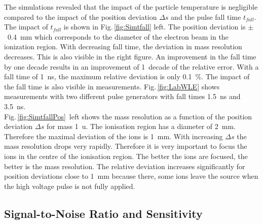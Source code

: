 	The simulations revealed that the impact of the particle temperature is negligible compared to the impact of the position deviation $\Delta s$ and the pulse fall time $t_{fall}$. The impact of $t_{fall}$ is shown in Fig.\,\ref{fig:Simtfall} left. The position deviation is $\pm$~0.4~mm which corresponds to the diameter of the electron beam in the ionization region. With decreasing fall time, the deviation in mass resolution decreases. This is also visible in the right figure. An improvement in the fall time by one decade results in an improvement of 1~decade of the relative error. With a fall time of 1~ns, the maximum relative deviation is only 0.1~\%. The impact of the fall time is also visible in measurements. Fig.\,\ref{fig:LabWLE} shows measurements with two different pulse generators with fall times 1.5~ns and 3.5~ns.\\
	Fig.\,\ref{fig:SimtfallPos}~left shows the mass resolution as a function of the position deviation $\Delta s$ for mass 1~u. The ionisation region has a diameter of 2~mm. Therefore the maximal deviation of the ions is 1~mm. With increasing $\Delta s$ the mass resolution drops very rapidly. Therefore it is very important to focus the ions in the centre of the ionisation region. The better the ions are focused, the better is the mass resolution. The relative deviation increases significantly for position deviations close to 1~mm because there, some ions leave the source when the high voltage pulse is not fully applied.\\

	\subsection{Signal-to-Noise Ratio and Sensitivity }
	
